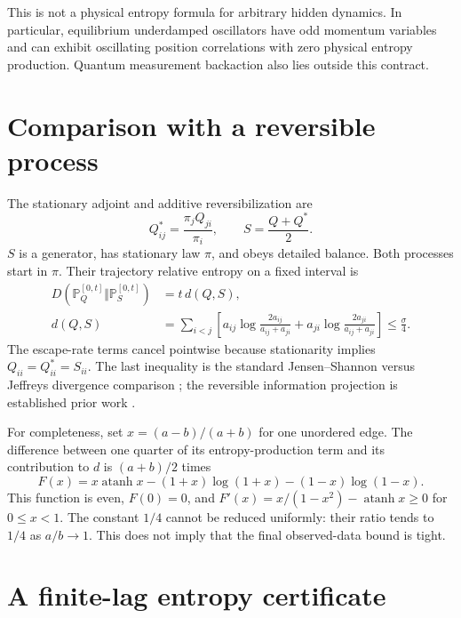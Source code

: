 This is not a physical entropy formula for arbitrary hidden dynamics.
In particular, equilibrium underdamped oscillators have odd momentum variables
and can exhibit oscillating position correlations with zero physical entropy
production. Quantum measurement backaction also lies outside this contract.

\section{Comparison with a reversible process}

The stationary adjoint and additive reversibilization are
\begin{equation}
 Q^*_{ij}=\frac{\pi_jQ_{ji}}{\pi_i},\qquad S=\frac{Q+Q^*}{2}.
\end{equation}
$S$ is a generator, has stationary law $\pi$, and obeys detailed balance.
Both processes start in $\pi$. Their trajectory relative entropy on a
fixed interval is
\begin{align}
 D(\mathbb P_Q^{[0,t]}\Vert\mathbb P_S^{[0,t]})
 &=t\,d(Q,S),\\
 d(Q,S)&=\sum_{i<j}\left[
 a_{ij}\log\frac{2a_{ij}}{a_{ij}+a_{ji}}
 +a_{ji}\log\frac{2a_{ji}}{a_{ij}+a_{ji}}\right]
 \le \frac{\sigma}{4}.
 \label{eq:rf-path-quarter}
\end{align}
The escape-rate terms cancel pointwise because stationarity implies
$Q_{ii}=Q^*_{ii}=S_{ii}$. The last inequality is the standard Jensen--Shannon versus
Jeffreys divergence comparison \cite{rfCrooks2011}; the reversible
information projection is established prior work \cite{rfChoi2024}.

For completeness, set $x=(a-b)/(a+b)$ for one unordered edge. The difference
between one quarter of its entropy-production term and its contribution to
$d$ is $(a+b)/2$ times
\[
 F(x)=x\operatorname{atanh}x
 -(1+x)\log(1+x)-(1-x)\log(1-x).
\]
This function is even, $F(0)=0$, and
$F'(x)=x/(1-x^2)-\operatorname{atanh}x\ge0$ for $0\le x<1$.
The constant $1/4$ cannot be reduced uniformly: their ratio tends to $1/4$
as $a/b\to1$. This does not imply that the final observed-data bound is tight.

\section{A finite-lag entropy certificate}

